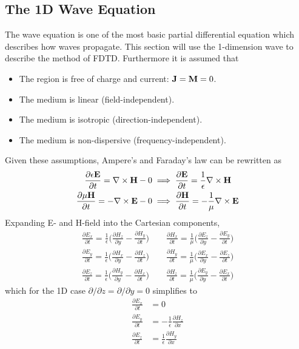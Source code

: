 \subsection{The 1D Wave Equation}
The wave equation is one of the most basic partial differential equation which describes how waves propagate. This section will use the 1-dimension wave to describe the method of FDTD. Furthermore it is assumed that
\begin{itemize}
\item The region is free of charge and current: $\bold{J} = \bold{M} = 0$.
\item The medium is linear (field-independent).
\item The medium is isotropic (direction-independent).
\item The medium is non-dispersive (frequency-independent).
\end{itemize}
Given these assumptions, Ampere's and Faraday's law can be rewritten as
\begin{align}
  \frac{\partial \epsilon \bold{E}}{\partial t} = \nabla \times \bold{H} - 0 & \implies \frac{\partial \bold{E}}{\partial t} = \frac{1}{\epsilon} \nabla \times \bold{H} \\
\frac{\partial \mu \bold{H}}{\partial t} =  - \nabla \times \bold{E} - 0 & \implies \frac{\partial \bold{H}}{\partial t} = - \frac{1}{\mu} \nabla \times \bold{E}
\end{align}
Expanding E- and H-field into the Cartesian components,
\begin{align}
  \frac{\partial E_x}{\partial t} = \frac{1}{\epsilon} \big(\frac{\partial H_z}{\partial y} - \frac{\partial H_y}{\partial t} \big) \qquad  
  \frac{\partial H_x}{\partial t} = \frac{1}{\mu} \big(\frac{\partial E_z}{\partial y} - \frac{\partial E_y}{\partial t} \big)\\
  \frac{\partial E_y}{\partial t} = \frac{1}{\epsilon} \big(\frac{\partial H_x}{\partial y} - \frac{\partial H_z}{\partial t} \big) \qquad 
  \frac{\partial H_y}{\partial t} = \frac{1}{\mu} \big(\frac{\partial E_x}{\partial y} - \frac{\partial E_z}{\partial t} \big) \\
  \frac{\partial E_z}{\partial t} = \frac{1}{\epsilon} \big(\frac{\partial H_y}{\partial y} - \frac{\partial H_x}{\partial t} \big) \qquad 
  \frac{\partial H_z}{\partial t} = \frac{1}{\mu} \big(\frac{\partial E_y}{\partial y} - \frac{\partial E_x}{\partial t} \big)
\end{align}
which for the 1D case $\partial/\partial z = \partial/\partial y = 0$ simplifies to 
\begin{align}
  \frac{\partial E_x}{\partial t} &= 0 \\
  \frac{\partial E_y}{\partial t} &= - \frac{1}{\epsilon} \frac{\partial H_z}{\partial x}\\
  \frac{\partial E_z}{\partial t} &= \frac{1}{\epsilon} \frac{\partial H_y}{\partial x}
\end{align}

